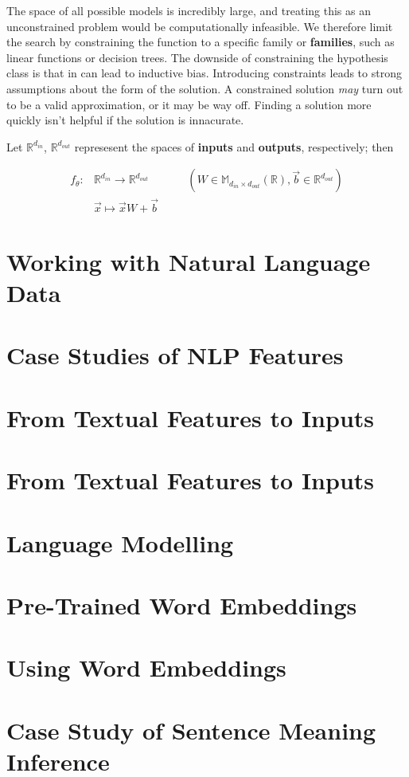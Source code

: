 \documentclass{article}
\begin{document}
The space of all possible models is incredibly large, and treating this as an unconstrained problem would be computationally infeasible. We therefore limit the search by constraining the function to a specific family or \textbf{families}, such as linear functions or decision trees. The downside of constraining the hypothesis class is that in can lead to inductive bias. Introducing constraints leads to strong assumptions about the form of the solution. A constrained solution \textit{may} turn out to be a valid approximation, or it may be way off. Finding a solution more quickly isn't helpful if the solution is innacurate. 

Let \(\mathbb{R}^{d_{in}}\), \(\mathbb{R}^{d_{out}}\) represesent the spaces of \textbf{inputs} and \textbf{outputs}, respectively; then 

\begin{align*}
  f_{\theta}: & \mathbb{R}^{d_{in}} \rightarrow \mathbb{R}^{d_{out}} & 
  \quad & (W \in \mathbb{M}_{d_{in} \times d_{out}}(\mathbb{R}), \vec{b} \in \mathbb{R}^{d_{out}}) \\
             & \vec{x} \mapsto \vec{x}W + \vec{b} &
\end{align*}

\section{Working with Natural Language Data}

\section{Case Studies of NLP Features}

\section{From Textual Features to Inputs}

\section{From Textual Features to Inputs}

\section{Language Modelling}

\section{Pre-Trained Word Embeddings}

\section{Using Word Embeddings}

\section{Case Study of Sentence Meaning Inference}
\printbibliography
\end{document}
